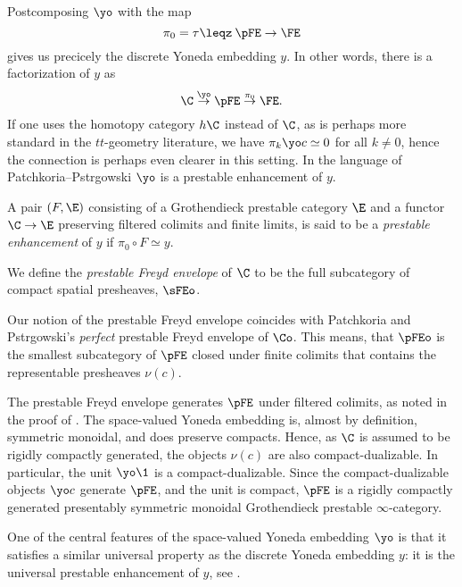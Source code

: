 Postcomposing $\yo$ with the map 
\[\pi_0 = \tau\leqz \: \pFE \to \FE\]
gives us precicely the discrete Yoneda embedding $y$. In other words, there is a factorization of $y$ as 
\[\C \overset{\yo}\to \pFE \overset{\pi_0}\to \FE.\]
If one uses the homotopy category $h\C$ instead of $\C$, as is perhaps more standard in the $tt$-geometry literature, we have $\pi_k \yo c \simeq 0$ for all $k\neq 0$, hence the connection is perhaps even clearer in this setting. In the language of Patchkoria--Pstr\a{}gowski $\yo$ is a prestable enhancement of $y$. 

\begin{definition}
    \label{def:prestable-enhancement}
    A pair $(F, \E)$ consisting of a Grothendieck prestable category $\E$ and a functor $\C \to \E$ preserving filtered colimits and finite limits, is said to be a \emph{prestable enhancement} of $y$ if $\pi_0 \circ F \simeq y$. 
\end{definition}

\begin{definition}
    We define the \emph{prestable Freyd envelope} of $\C$ to be the full subcategory of compact spatial presheaves, $\sFEo$.
\end{definition}

\begin{remark}
    Our notion of the prestable Freyd envelope coincides with Patchkoria and Pstr\a{}gowski's \emph{perfect} prestable Freyd envelope of $\Co$. This means, that $\pFEo$ is the smallest subcategory of $\pFE$ closed under finite colimits that contains the representable presheaves $\nu(c)$. 
\end{remark}

\begin{remark}
    \label{rm:pFE-is-rigidly-compactly-generated}
    The prestable Freyd envelope generates $\pFE$ under filtered colimits, as noted in the proof of \cite[6.47]{patchkoria-pstragowski_2021}. The space-valued Yoneda embedding is, almost by definition, symmetric monoidal, and does preserve compacts. Hence, as $\C$ is assumed to be rigidly compactly generated, the objects $\nu(c)$ are also compact-dualizable. In particular, the unit $\yo \1$ is a compact-dualizable. Since the compact-dualizable objects $\yo c$ generate $\pFE$, and the unit is compact, $\pFE$ is a rigidly compactly generated presentably symmetric monoidal Grothendieck prestable $\infty$-category.  
\end{remark}

\begin{remark}
    One of the central features of the space-valued Yoneda embedding $\yo$ is that it satisfies a similar universal property as the discrete Yoneda embedding $y$: it is the universal prestable enhancement of $y$, see \cite[6.40. 6.47]{patchkoria-pstragowski_2021}. 
\end{remark}

